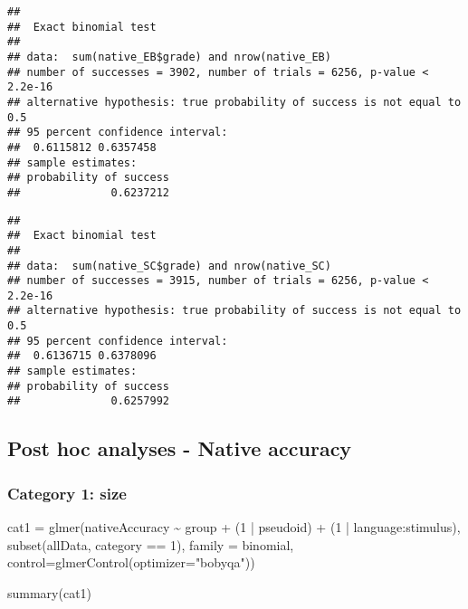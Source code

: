 \documentclass[
]{article}
\newenvironment{Shaded}{\begin{snugshade}}{\end{snugshade}}
\newcommand{\AttributeTok}[1]{\textcolor[rgb]{0.77,0.63,0.00}{#1}}
\newcommand{\DecValTok}[1]{\textcolor[rgb]{0.00,0.00,0.81}{#1}}
\newcommand{\FunctionTok}[1]{\textcolor[rgb]{0.00,0.00,0.00}{#1}}
\newcommand{\NormalTok}[1]{#1}
\newcommand{\OtherTok}[1]{\textcolor[rgb]{0.56,0.35,0.01}{#1}}
\newcommand{\SpecialCharTok}[1]{\textcolor[rgb]{0.00,0.00,0.00}{#1}}
\newcommand{\StringTok}[1]{\textcolor[rgb]{0.31,0.60,0.02}{#1}}
\begin{document}
\begin{verbatim}
## 
##  Exact binomial test
## 
## data:  sum(native_EB$grade) and nrow(native_EB)
## number of successes = 3902, number of trials = 6256, p-value < 2.2e-16
## alternative hypothesis: true probability of success is not equal to 0.5
## 95 percent confidence interval:
##  0.6115812 0.6357458
## sample estimates:
## probability of success 
##              0.6237212
\end{verbatim}

\begin{Shaded}
\end{Shaded}

\begin{verbatim}
## 
##  Exact binomial test
## 
## data:  sum(native_SC$grade) and nrow(native_SC)
## number of successes = 3915, number of trials = 6256, p-value < 2.2e-16
## alternative hypothesis: true probability of success is not equal to 0.5
## 95 percent confidence interval:
##  0.6136715 0.6378096
## sample estimates:
## probability of success 
##              0.6257992
\end{verbatim}

\hypertarget{post-hoc-analyses---native-accuracy}{%
\subsection{Post hoc analyses - Native
accuracy}\label{post-hoc-analyses---native-accuracy}}

\hypertarget{category-1-size}{%
\subsubsection{Category 1: size}\label{category-1-size}}

\begin{Shaded}
\begin{Highlighting}[]
\NormalTok{cat1 }\OtherTok{=} \FunctionTok{glmer}\NormalTok{(nativeAccuracy }\SpecialCharTok{\textasciitilde{}}\NormalTok{ group }\SpecialCharTok{+}
\NormalTok{        (}\DecValTok{1} \SpecialCharTok{|}\NormalTok{ pseudoid) }\SpecialCharTok{+}\NormalTok{ (}\DecValTok{1} \SpecialCharTok{|}\NormalTok{ language}\SpecialCharTok{:}\NormalTok{stimulus),}
      \FunctionTok{subset}\NormalTok{(allData, category }\SpecialCharTok{==} \DecValTok{1}\NormalTok{),}
      \AttributeTok{family =}\NormalTok{ binomial,}
      \AttributeTok{control=}\FunctionTok{glmerControl}\NormalTok{(}\AttributeTok{optimizer=}\StringTok{"bobyqa"}\NormalTok{))}

\FunctionTok{summary}\NormalTok{(cat1)}
\end{Highlighting}
\end{Shaded}
\end{document}
